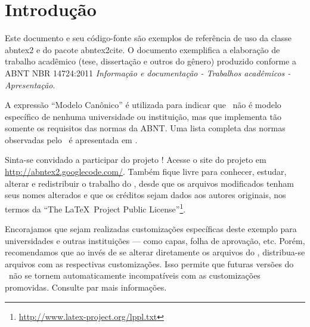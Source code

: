\documentclass[
    12pt,               %
    openright,          %
    twoside,            %
    a4paper,            %
    english,            %
    french,             %
    spanish,            %
    brazil              %
    ]{abntex2}
\begin{document}
\tableofcontents*
\cleardoublepage



\textual

\chapter*[Introdução]{Introdução}

Este documento e seu código-fonte são exemplos de referência de uso da classe
\textsf{abntex2} e do pacote \textsf{abntex2cite}. O documento 
exemplifica a elaboração de trabalho acadêmico (tese, dissertação e outros do
gênero) produzido conforme a ABNT NBR 14724:2011 \emph{Informação e documentação
- Trabalhos acadêmicos - Apresentação}.

A expressão ``Modelo Canônico'' é utilizada para indicar que \abnTeX\ não é
modelo específico de nenhuma universidade ou instituição, mas que implementa tão
somente os requisitos das normas da ABNT. Uma lista completa das normas
observadas pelo \abnTeX\ é apresentada em .

Sinta-se convidado a participar do projeto \abnTeX! Acesse o site do projeto em
\url{http://abntex2.googlecode.com/}. Também fique livre para conhecer,
estudar, alterar e redistribuir o trabalho do \abnTeX, desde que os arquivos
modificados tenham seus nomes alterados e que os créditos sejam dados aos
autores originais, nos termos da ``The \LaTeX\ Project Public
License''\footnote{\url{http://www.latex-project.org/lppl.txt}}.

Encorajamos que sejam realizadas customizações específicas deste exemplo para
universidades e outras instituições --- como capas, folha de aprovação, etc.
Porém, recomendamos que ao invés de se alterar diretamente os arquivos do
\abnTeX, distribua-se arquivos com as respectivas customizações.
Isso permite que futuras versões do \abnTeX~não se tornem automaticamente
incompatíveis com as customizações promovidas. Consulte
 par mais informações.
\end{document}
